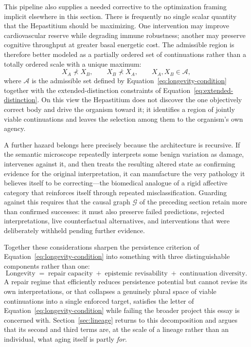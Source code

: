 \documentclass[12pt]{article}
\begin{document}
This pipeline also supplies a needed corrective to the optimization framing implicit elsewhere in this section. There is frequently no single scalar quantity that the Hepastitium should be maximizing. One intervention may improve cardiovascular reserve while degrading immune robustness; another may preserve cognitive throughput at greater basal energetic cost. The admissible region is therefore better modeled as a partially ordered set of continuations rather than a totally ordered scale with a unique maximum:
\begin{equation}
X_A \nprec X_B, \qquad X_B \nprec X_A, \qquad X_A, X_B \in \mathcal{A},
\label{eq:partial-order}
\end{equation}
where $\mathcal{A}$ is the admissible set defined by Equation~\eqref{eq:longevity-condition} together with the extended-distinction constraints of Equation~\eqref{eq:extended-distinction}. On this view the Hepastitium does not discover the one objectively correct body and drive the organism toward it; it identifies a region of jointly viable continuations and leaves the selection among them to the organism's own agency.

A further hazard belongs here precisely because the architecture is recursive. If the semantic microscope repeatedly interprets some benign variation as damage, intervenes against it, and then treats the resulting altered state as confirming evidence for the original interpretation, it can manufacture the very pathology it believes itself to be correcting---the biomedical analogue of a rigid affective category that reinforces itself through repeated misclassification. Guarding against this requires that the causal graph $\mathcal{G}$ of the preceding section retain more than confirmed successes: it must also preserve failed predictions, rejected interpretations, live counterfactual alternatives, and interventions that were deliberately withheld pending further evidence.

Together these considerations sharpen the persistence criterion of Equation~\eqref{eq:longevity-condition} into something with three distinguishable components rather than one:
\begin{equation}
\text{Longevity} \;=\; \text{repair capacity} \;+\; \text{epistemic revisability} \;+\; \text{continuation diversity}.
\label{eq:longevity-decomposition}
\end{equation}
A repair regime that efficiently reduces persistence potential but cannot revise its own interpretations, or that collapses a genuinely plural space of viable continuations into a single enforced target, satisfies the letter of Equation~\eqref{eq:longevity-condition} while failing the broader project this essay is concerned with. Section~\ref{sec:lineage} returns to this decomposition and argues that its second and third terms are, at the scale of a lineage rather than an individual, what aging itself is partly \emph{for}.
\end{document}
